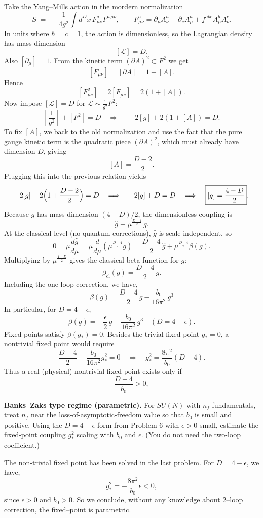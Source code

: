 \begin{solution}[31.6]
Take the Yang--Mills action in the mordern normalization
	\[
	S \;=\; -\frac{1}{4g^2}\int d^D x\, F_{\mu\nu}^a F^{a\,\mu\nu},
	\qquad
	F_{\mu\nu}^a=\partial_\mu A_\nu^a-\partial_\nu A_\mu^a + f^{abc}A_\mu^b A_\nu^c.
	\]
	In units where \(\hbar=c=1\), the action is dimensionless, so the Lagrangian density has mass dimension
	\[
	[\mathcal L]=D.
	\]
	Also \([\partial_\mu]=1\). From the kinetic term \((\partial A)^2\subset F^2\) we get
	\[
	[F_{\mu\nu}]=[\partial A]=1+[A].
	\]
	Hence
	\[
	[F_{\mu\nu}^2]=2[F_{\mu\nu}]=2(1+[A]).
	\]
	Now impose \([\mathcal L]=D\) for \(\mathcal L\sim \frac{1}{g^2}F^2\):
	\[
	\left[\frac{1}{g^2}\right]+[F^2]=D
	\quad\Longrightarrow\quad
	-2[g]+2(1+[A])=D.
	\]
	To fix \([A]\), we back to the old normalization and use the fact that the pure gauge kinetic term is the quadratic piece \((\partial A)^2\), which must already have dimension \(D\), giving
	\[
	[A]=\frac{D-2}{2}.
	\]
	Plugging this into the previous relation yields
	\[
	-2[g]+2\Bigl(1+\frac{D-2}{2}\Bigr)=D
	\quad\Longrightarrow\quad
	-2[g]+D=D
	\quad\Longrightarrow\quad
	\boxed{[g]=\frac{4-D}{2}}.
	\]
	Because \(g\) has mass dimension \((4-D)/2\), the dimensionless coupling is
	\[
	\hat g \equiv \mu^{\frac{D-4}{2}}\,g.
	\]
	At the classical level (no quantum corrections), \(\hat g\) is scale independent, so
	\[
	0=\mu\frac{d\hat g}{d\mu}
	=\mu\frac{d}{d\mu}\left(\mu^{\frac{D-4}{2}}g\right)
	=\frac{D-4}{2}\,\hat g+\mu^{\frac{D-4}{2}}\beta(g).
	\]
	Multiplying by \(\mu^{\frac{4-D}{2}}\) gives the classical beta function for \(g\):
	\[
	\boxed{\beta_{\mathrm{cl}}(g)=\frac{D-4}{2}\,g.}
	\]
	Including the one-loop correction, we have,
	\[
	\boxed{\beta(g)=\frac{D-4}{2}\,g-\frac{b_0}{16\pi^2}\,g^3}
	\]
	In particular, for \(D=4-\epsilon\),
	\[
	\beta(g)=-\frac{\epsilon}{2}\,g-\frac{b_0}{16\pi^2}\,g^3\quad (D=4-\epsilon).
	\]
	Fixed points satisfy \(\beta(g_*)=0\). Besides the trivial fixed point \(g_*=0\), a nontrivial fixed point would require
	\[
	\frac{D-4}{2}-\frac{b_0}{16\pi^2}g_*^2=0
	\quad\Longrightarrow\quad
	\boxed{g_*^2=\frac{8\pi^2}{b_0}(D-4).}
	\]
	Thus a real (physical) nontrivial fixed point exists only if
	\[
	\boxed{\frac{D-4}{b_0}>0,}
	\]
\end{solution}
\begin{problem}
    \textbf{Banks–Zaks type regime (parametric).} For \(SU(N)\) with \(n_f\) fundamentals, treat \(n_f\) near the loss-of-asymptotic-freedom value so that \(b_0\) is small and positive. Using the \(D=4-\epsilon\) form from Problem 6 with \(\epsilon>0\) small, estimate the fixed-point coupling \(g_*^2\) scaling with \(b_0\) and \(\epsilon\). (You do not need the two-loop coefficient.)
\end{problem}
\begin{solution}[31.7]
	The non-trivial fixed point has been solved in the last problem. For $D=4-\epsilon$, we have,
	\[
	\boxed{
	g_*^2=-\frac{8\pi^2}{b_0}\epsilon<0},
	\]
	since $\epsilon>0$ and $b_0>0$. So we conclude, without any knowledge about 2--loop correction, the fixed--point is parametric.
\end{solution}
